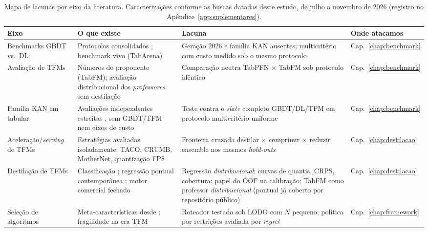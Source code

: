 \begin{table}[htbp]
\centering
\caption[Mapa de lacunas por eixo da literatura]{Mapa de lacunas por
eixo da literatura. Caracterizações conforme as buscas datadas deste
estudo, de julho a novembro de 2026 (registro no
Apêndice~\ref{app:suplementares}).}
\label{tab:lacunas}
\small
\begin{tabular}{>{\raggedright\arraybackslash}p{}>{\raggedright\arraybackslash}p{}>{\raggedright\arraybackslash}p{}>{\raggedright\arraybackslash}p{}}
\toprule
\textbf{Eixo} & \textbf{O que existe} & \textbf{Lacuna} & \textbf{Onde atacamos} \\
\midrule
Benchmarks GBDT vs.\ DL &
Protocolos consolidados \citep{grinsztajn2022,mcelfresh2023,gorishniy2021};
benchmark vivo (TabArena) &
Geração 2026 e família KAN ausentes; multicritério com custo medido sob o
mesmo protocolo &
Cap.~\ref{chap:benchmark} \\
\addlinespace
Avaliação de TFMs &
Números do proponente (TabFM); avaliação distribucional dos
\emph{professores} sem destilação
\citep{izbicki2026,landsgesell2026,scoringbench2026} &
Comparação neutra TabPFN $\times$ TabFM sob protocolo idêntico &
Cap.~\ref{chap:benchmark} \\
\addlinespace
Família KAN em tabular &
Avaliações independentes estreitas \citep{poeta2024,kancritical2024}, sem
GBDT/TFM nem eixos de custo &
Teste contra o \emph{slate} completo GBDT/DL/TFM em protocolo multicritério
uniforme &
Cap.~\ref{chap:benchmark} \\
\addlinespace
Aceleração/\emph{serving} de TFMs &
Estratégias avaliadas isoladamente: TACO, CRUMB, MotherNet, quantização
FP8 \citep{taco2026,crumb2026,mothernet2023,kubler2026} &
Fronteira cruzada destilar $\times$ comprimir $\times$ reduzir ensemble nos
mesmos \emph{hold-outs} &
Cap.~\ref{chap:destilacao} \\
\addlinespace
Destilação de TFMs &
Classificação \citep{pocketfm2026,pocketfmhealth2026,gear2026}; regressão
pontual contemporânea \citep{jeong2026}; motor comercial fechado
\citep{priorlabs2025} &
Regressão \emph{distribucional}: curvas de quantis, CRPS, cobertura; papel
do OOF na calibração; TabFM como professor \emph{distribucional}
(pontual já coberto por repositório público) &
Cap.~\ref{chap:destilacao} \\
\addlinespace
Seleção de algoritmos &
Meta-características desde \citet{rice1976}; fragilidade na era TFM
\citep{herre2026} &
Roteador testado sob LODO com $N$ pequeno; política por restrições
avaliada por \emph{regret} &
Cap.~\ref{chap:framework} \\
\bottomrule
\end{tabular}
\end{table}


